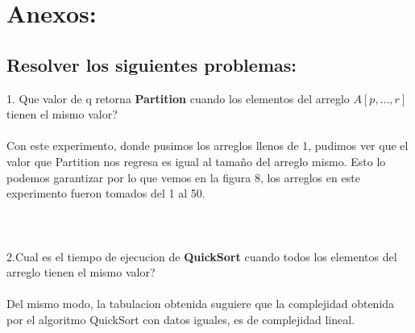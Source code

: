 \documentclass[spanish]{article}
\begin{document}
	\bigskip

	\newpage

	\section{Anexos:}
	
	\subsection{Resolver los siguientes problemas:}

	{\large 1. Que valor de q retorna {\bf Partition} cuando los elementos del arreglo $A[p, ... ,r]$ tienen el mismo valor?}\\\\
	Con este experimento, donde pusimos los arreglos llenos de 1, pudimos ver que el valor que Partition nos regresa es igual al tamaño del arreglo mismo. Esto lo podemos garantizar por lo que vemos en la figura 8, los arreglos en este experimento fueron tomados del 1 al 50.\\\\\\\\
	{\large 2.Cual es el tiempo de ejecucion de {\bf QuickSort} cuando todos los elementos del arreglo tienen el mismo valor?}\\\\
	Del mismo modo, la tabulacion obtenida suguiere que la complejidad obtenida por el algoritmo QuickSort con datos iguales, es de complejidad lineal.
\end{document}
